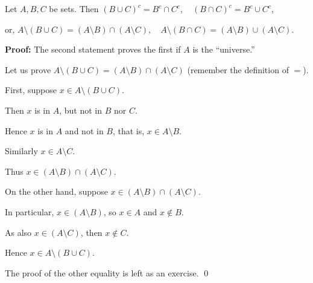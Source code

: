 \documentclass[10pt,aspectratio=149]{beamer}
\begin{document}
\begin{frame}
\begin{center}
\end{center}
\end{frame}

\begin{frame}
\begin{theorem}[DeMorgan]
Let $A, B, C$ be sets.  Then
\quad
${(B \cup C)}^c = B^c \cap C^c , \quad
{(B \cap C)}^c = B^c \cup C^c$,

\medskip
\pause

or,
\quad
$A \setminus (B \cup C) = (A \setminus B) \cap (A \setminus C) , \quad
A \setminus (B \cap C) = (A \setminus B) \cup (A \setminus C)$.
\end{theorem}

\pause
\textbf{Proof:}
The second statement proves the first if $A$ is the ``universe.''

\medskip
\pause

Let us prove $A \setminus (B \cup C) = (A \setminus B) \cap (A \setminus C)$
\quad (remember the definition of $=$).

\medskip
\pause

%
%
%

First, suppose
$x \in A \setminus (B \cup C)$.

\pause

Then $x$ is in $A$, but not in $B$ nor $C$.

\pause

Hence $x$ is in $A$ and not in $B$, that is, $x \in A \setminus B$.

\pause

Similarly $x \in A \setminus C$.

\pause

Thus $x \in (A \setminus B) \cap (A \setminus C)$.

\medskip
\pause

On the other hand, suppose 
$x \in (A \setminus B) \cap (A \setminus C)$.

\pause

In particular, $x \in (A \setminus B)$, so $x \in A$ and $x \notin B$.

\pause

As also $x \in (A \setminus C)$, then $x \notin C$.

\pause

Hence $x \in A \setminus (B \cup C)$.

\medskip
\pause

The proof of the other equality is left as an exercise.
\qed
\end{frame}
\end{document}
